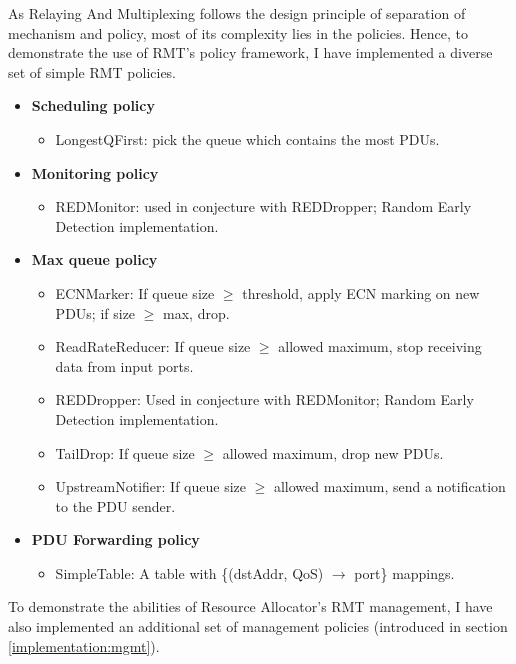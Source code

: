         As Relaying And Multiplexing follows the design principle of separation of mechanism and policy, most of its complexity lies in the policies. Hence, to demonstrate the use of RMT's policy framework, I have implemented a diverse set of simple RMT policies.

        \begin{itemize}
            \item \textbf{Scheduling policy}
            \begin{itemize}
                \item LongestQFirst: pick the queue which contains the most PDUs.
            \end{itemize}
            \item \textbf{Monitoring policy}
            \begin{itemize}
                \item REDMonitor: used in conjecture with REDDropper; Random Early Detection implementation.
            \end{itemize}
            \item \textbf{Max queue policy}
            \begin{itemize}
                \item ECNMarker: If queue size $\geq$ threshold, apply ECN marking on new PDUs; if size $\geq$ max, drop.
                \item ReadRateReducer: If queue size $\geq$ allowed maximum, stop receiving data from input ports.
                \item REDDropper: Used in conjecture with REDMonitor; Random Early Detection implementation.
                \item TailDrop: If queue size $\geq$ allowed maximum, drop new PDUs.
                \item UpstreamNotifier: If queue size $\geq$ allowed maximum, send a notification to the PDU sender.
            \end{itemize}
            \item \textbf{PDU Forwarding policy}
            \begin{itemize}
                \item SimpleTable: A table with \{(dstAddr, QoS) $\rightarrow$ port\} mappings.
            \end{itemize}
        \end{itemize}

        To demonstrate the abilities of Resource Allocator's RMT management, I have also implemented an additional set of management policies (introduced in section \ref{implementation:mgmt}).

